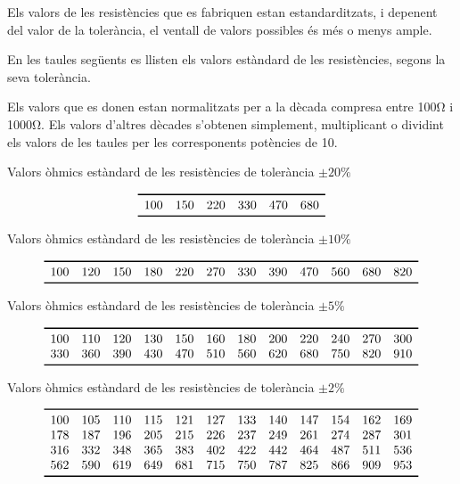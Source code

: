 Els valors de les resist\`{e}ncies que es fabriquen estan estandarditzats, i depenent
del valor de la toler\`{a}ncia, el ventall de valors possibles \'{e}s m\'{e}s o menys ample.

En les taules seg\"{u}ents es llisten els valors est\`{a}ndard de les resist\`{e}ncies, segons la seva
toler\`{a}ncia.

Els valors que es donen estan normalitzats per a la d\`{e}cada compresa
entre 100\unit{\ohm} i 1000\unit{\ohm}. Els valors d'altres d\`{e}cades
s'obtenen simplement, multiplicant o dividint els valors de les
taules per les corresponents  pot\`{e}ncies de 10.

\begin{table}[htb]
   \caption{Valors \`{o}hmics est\`{a}ndard de les resist\`{e}ncies de toler\`{a}ncia $\pm20\unit{\%}$}
   \[ \begin{array}{cccccc}
   \toprule[1pt]
   100 & 150 & 220 & 330 & 470 &  680  \\
   \bottomrule[1pt]
   \end{array}   \]
\end{table}

\begin{table}[htb]
   \caption{Valors \`{o}hmics est\`{a}ndard de les resist\`{e}ncies de toler\`{a}ncia $\pm10\unit{\%}$}
   \[ \begin{array}{cccccccccccc}
   \toprule[1pt]
   100 & 120 & 150 & 180 & 220 & 270 & 330 & 390 & 470 & 560 & 680 & 820 \\
   \bottomrule[1pt]
   \end{array}   \]
\end{table}

\begin{table}[htb]
   \caption{Valors \`{o}hmics est\`{a}ndard de les resist\`{e}ncies de toler\`{a}ncia $\pm5\unit{\%}$}
   \[ \begin{array}{cccccccccccc}
   \toprule[1pt]
   100 & 110 & 120 & 130 & 150 & 160 & 180 & 200 & 220 & 240 & 270 & 300 \\
   330 & 360 & 390 & 430 & 470 & 510 & 560 & 620 & 680 & 750 & 820 & 910 \\
   \bottomrule[1pt]
   \end{array}   \]
\end{table}

\begin{table}[htb]
   \caption{Valors \`{o}hmics est\`{a}ndard de les resist\`{e}ncies de toler\`{a}ncia $\pm2\unit{\%}$}
   \[ \begin{array}{cccccccccccc}
   \toprule[1pt]
   100 & 105 & 110 & 115 & 121 & 127 & 133 & 140 & 147 & 154 & 162 & 169 \\
   178 & 187 & 196 & 205 & 215 & 226 & 237 & 249 & 261 & 274 & 287 & 301 \\
   316 & 332 & 348 & 365 & 383 & 402 & 422 & 442 & 464 & 487 & 511 & 536 \\
   562 & 590 & 619 & 649 & 681 & 715 & 750 & 787 & 825 & 866 & 909 & 953 \\
   \bottomrule[1pt]
   \end{array}   \]
\end{table}

